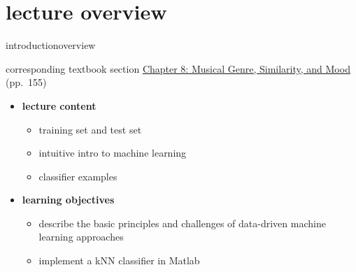




\subtitle{Module 8.0: Classifiers}


	

    \section[overview]{lecture overview}
        \begin{frame}{introduction}{overview}
            \begin{block}{corresponding textbook section}
                    \href{http://ieeexplore.ieee.org/xpl/articleDetails.jsp?arnumber=6331125}{Chapter 8: Musical Genre, Similarity, and Mood} (pp.~155)
            \end{block}

            \begin{itemize}
                \item   \textbf{lecture content}
                    \begin{itemize}
                        \item   training set and test set
                        \item   intuitive intro to machine learning
                        \item   classifier examples
                    \end{itemize}
                \bigskip
                \item<2->   \textbf{learning objectives}
                    \begin{itemize}
                        \item   describe the basic principles and challenges of data-driven machine learning approaches
                        \item   implement a kNN classifier in Matlab
                    \end{itemize}
            \end{itemize}
        \end{frame}


